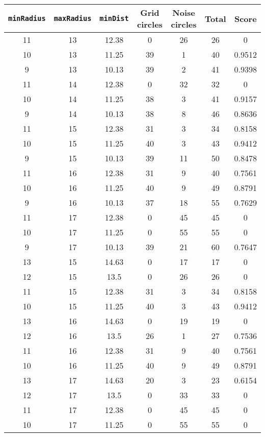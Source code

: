 \documentclass[letterpaper, 12pt]{article}
\begin{document}
\begin{longtable}{|c|c|c|c|c|c|c|}
\hline
\textbf{\texttt{minRadius}} & \textbf{\texttt{maxRadius}} & \textbf{\texttt{minDist}} & \textbf{Grid circles} & \textbf{Noise circles} & \textbf{Total} & \textbf{Score} \\
\hline
11 & 13 & 12.38 & 0 & 26 & 26 & 0 \\
\hline
10 & 13 & 11.25 & 39 & 1 & 40 & 0.9512 \\
\hline
9 & 13 & 10.13 & 39 & 2 & 41 & 0.9398 \\
\hline
11 & 14 & 12.38 & 0 & 32 & 32 & 0 \\
\hline
10 & 14 & 11.25 & 38 & 3 & 41 & 0.9157 \\
\hline
9 & 14 & 10.13 & 38 & 8 & 46 & 0.8636 \\
\hline
11 & 15 & 12.38 & 31 & 3 & 34 & 0.8158 \\
\hline
10 & 15 & 11.25 & 40 & 3 & 43 & 0.9412 \\
\hline
9 & 15 & 10.13 & 39 & 11 & 50 & 0.8478 \\
\hline
11 & 16 & 12.38 & 31 & 9 & 40 & 0.7561 \\
\hline
10 & 16 & 11.25 & 40 & 9 & 49 & 0.8791 \\
\hline
9 & 16 & 10.13 & 37 & 18 & 55 & 0.7629 \\
\hline
11 & 17 & 12.38 & 0 & 45 & 45 & 0 \\
\hline
10 & 17 & 11.25 & 0 & 55 & 55 & 0 \\
\hline
9 & 17 & 10.13 & 39 & 21 & 60 & 0.7647 \\
\hline
13 & 15 & 14.63 & 0 & 17 & 17 & 0 \\
\hline
12 & 15 & 13.5 & 0 & 26 & 26 & 0 \\
\hline
11 & 15 & 12.38 & 31 & 3 & 34 & 0.8158 \\
\hline
10 & 15 & 11.25 & 40 & 3 & 43 & 0.9412 \\
\hline
13 & 16 & 14.63 & 0 & 19 & 19 & 0 \\
\hline
12 & 16 & 13.5 & 26 & 1 & 27 & 0.7536 \\
\hline
11 & 16 & 12.38 & 31 & 9 & 40 & 0.7561 \\
\hline
10 & 16 & 11.25 & 40 & 9 & 49 & 0.8791 \\
\hline
13 & 17 & 14.63 & 20 & 3 & 23 & 0.6154 \\
\hline
12 & 17 & 13.5 & 0 & 33 & 33 & 0 \\
\hline
11 & 17 & 12.38 & 0 & 45 & 45 & 0 \\
\hline
10 & 17 & 11.25 & 0 & 55 & 55 & 0 \\

\end{longtable}
\end{document}
